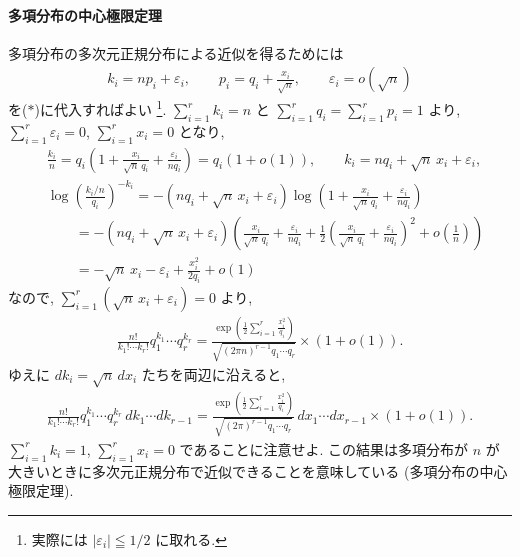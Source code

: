 \documentclass[12pt,twoside]{jarticle}
\newcommand\eps{\varepsilon}
\theoremstyle{jplain}
\theoremstyle{jplain}
\theoremstyle{jplain}
\numberwithin{theorem}{section}
\numberwithin{equation}{section}
\numberwithin{figure}{section}
\numberwithin{table}{section}
\begin{document}
\paragraph{多項分布の中心極限定理}
多項分布の多次元正規分布による近似を得るためには
\begin{align*}
k_i = np_i + \eps_i, \qquad
p_i = q_i + \frac{x_i}{\sqrt{n}}, \qquad
\eps_i = o(\sqrt{n})
\end{align*}
を($*$)に代入すればよい%
\footnote{実際には $|\eps_i|\leqq 1/2$ に取れる.}.
$\sum_{i=1}^r k_i=n$ と $\sum_{i=1}^r q_i=\sum_{i=1}^r p_i=1$ より,
$\sum_{i=1}^r \eps_i=0$, $\sum_{i=1}^r x_i=0$ となり,
\begin{align*}
&
\frac{k_i}{n}
=q_i\left(1+\frac{x_i}{\sqrt{n}\,q_i}+\frac{\eps_i}{nq_i}\right)
=q_i(1+o(1)),
\qquad
k_i = nq_i + \sqrt{n}\,x_i+\eps_i,
\\ &
\log\left(\frac{k_i/n}{q_i}\right)^{-k_i}
=-(nq_i+\sqrt{n}\,x_i+\eps_i)
\log\left(1+\frac{x_i}{\sqrt{n}\,q_i}+\frac{\eps_i}{nq_i}\right)
\\ & \qquad
=-(nq_i+\sqrt{n}\,x_i+\eps_i)
\left(
  \frac{x_i}{\sqrt{n}\,q_i}+\frac{\eps_i}{nq_i}
 +\frac{1}{2}
  \left(\frac{x_i}{\sqrt{n}\,q_i}+\frac{\eps_i}{nq_i}\right)^2
 +o\left(\frac{1}{n}\right)
\right)
\\ & \qquad
=-\sqrt{n}\,x_i-\eps_i+\frac{x_i^2}{2q_i}+o(1)
\end{align*}
なので, $\sum_{i=1}^r(\sqrt{n}\,x_i+\eps_i)=0$ より,
\begin{align*}
\frac{n!}{k_1!\cdots k_r!}q_1^{k_1}\cdots q_r^{k_r}
=
\frac
{\displaystyle\exp\left(\frac{1}{2}\sum_{i=1}^r\frac{x_i^2}{q_i}\right)}
{\sqrt{(2\pi n)^{r-1}q_1\cdots q_r}}
\times(1+o(1)).
\end{align*}
ゆえに $dk_i=\sqrt{n}\,dx_i$ たちを両辺に沿えると,
\begin{align*}
\frac{n!}{k_1!\cdots k_r!}q_1^{k_1}\cdots q_r^{k_r}
\,dk_1\cdots dk_{r-1}
=
\frac
{\displaystyle\exp\left(\frac{1}{2}\sum_{i=1}^r\frac{x_i^2}{q_i}\right)}
{\sqrt{(2\pi)^{r-1}q_1\cdots q_r}}
\,dx_1\cdots dx_{r-1}
\times(1+o(1)).
\end{align*}
$\sum_{i=1}^r k_i=1$, $\sum_{i=1}^r x_i=0$ であることに注意せよ.
この結果は多項分布が $n$ が大きいときに多次元正規分布で近似できることを意味している
(多項分布の中心極限定理).
\end{document}
